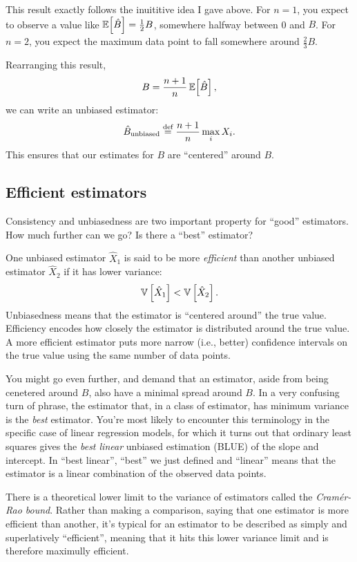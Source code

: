 This result exactly follows the inuititive idea I gave above. For $n=1$, you
expect to observe a value like $\mathbb{E}\!\left[{\hat{B}}\right] = \tfrac{1}{2} B$, somewhere
halfway between 0 and $B$. For $n=2$, you expect the maximum data point to fall
somewhere around $\tfrac{2}{3} B$.

Rearranging this result,
\begin{equation}
    B = \frac{n+1}{n} \, \mathbb{E}\!\left[{\hat{B}}\right],
\end{equation}
we can write an unbiased estimator:
\begin{equation}
\hat{B}_\mathrm{unbiased} \stackrel{\text{def}}{=} \frac{n+1}{n} \max_i X_i.
\end{equation}
This ensures that our estimates for $B$ are ``centered'' around $B$.

\subsection{Efficient estimators}

Consistency and unbiasedness are two important property for ``good'' estimators.
How much further can we go? Is there a ``best'' estimator?

One unbiased estimator $\hat{X}_1$ is said to be more \emph{efficient} than another
unbiased estimator $\hat{X}_2$ if it has lower variance:
\begin{equation*}
    \mathbb{V}\left[{\hat{X}_1}\right] < \mathbb{V}\left[{\hat{X}_2}\right].
\end{equation*}
Unbiasedness means that the estimator is ``centered around'' the true value.
Efficiency encodes how closely the estimator is distributed around the true
value. A more efficient estimator puts more narrow (i.e., better) confidence
intervals on the true value using the same number of data points.

You might go even further, and demand that an estimator, aside from being
cenetered around $B$, also have a minimal spread around $B$. In a very
confusing turn of phrase, the estimator that, in a class of estimator, has
minimum variance is the \emph{best} estimator. You're most likely to encounter
this terminology in the specific case of linear regression models, for which
it turns out that ordinary least squares gives the \emph{best linear} unbiased
estimation (BLUE) of the slope and intercept. In ``best linear'', ``best'' we just
defined and ``linear'' means that the estimator is a linear combination of the
observed data points.

There is a theoretical lower limit to the variance of estimators called the
\emph{Cram\'{e}r-Rao bound}. Rather than making a comparison, saying that one
estimator is more efficient than another, it's typical for an estimator to be
described as simply and superlatively ``efficient'', meaning that it hits this
lower variance limit and is therefore maximully efficient.

